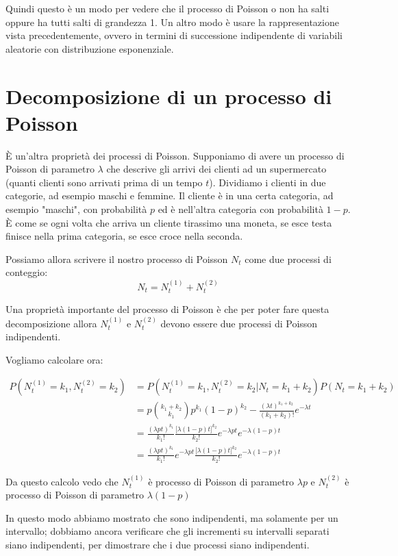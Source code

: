 \documentclass[a4paper,12pt]{book}
\begin{document}
Quindi questo è un modo per vedere che il processo di Poisson o non ha salti oppure ha tutti salti di grandezza 1. Un altro modo è usare la rappresentazione vista precedentemente, ovvero in termini di successione indipendente di variabili aleatorie con distribuzione esponenziale. 

\section{Decomposizione di un processo di Poisson}
È un'altra proprietà dei processi di Poisson. Supponiamo di avere un processo di Poisson di parametro $\lambda$ che descrive gli arrivi dei clienti ad un supermercato (quanti clienti sono arrivati prima di un tempo $ t $). Dividiamo i clienti in due categorie, ad esempio maschi e femmine. Il cliente è in una certa categoria, ad esempio "maschi", con probabilità $ p $ ed è nell'altra categoria con probabilità $ 1-p $. È come se ogni volta che arriva un cliente tirassimo una moneta, se esce testa finisce nella prima categoria, se esce croce nella seconda. 

Possiamo allora scrivere il nostro processo di Poisson $ N_t $ come due processi di conteggio:
$$ N_t = N_t^{(1)} + N_t^{(2)} $$

Una proprietà importante del processo di Poisson è che per poter fare questa decomposizione allora $ N_t^{(1)} $ e $ N_t^{(2)} $ devono essere due processi di Poisson indipendenti. 

Vogliamo calcolare ora:

\begin{align*}
	P(N_t^{(1)} = k_1, N_t^{(2)} = k_2) & = P(N_t^{(1)} = k_1, N_t^{(2)} = k_2 | N_t = k_1 + k_2) P(N_t = k_1 + k_2) \\
	& = p \binom{k_1 + k_2}{k_1} p^{k_1} (1-p)^{k_2} - \frac{(\lambda t)^{k_1 + k_2}}{(k_1 + k_2)!} e^{-\lambda t} \\
	& = \frac{(\lambda p t)^{k_1}}{k_1!} \frac{\big[ \lambda(1-p)t \big]^{k_2}}{k_2!} e^{-\lambda p t} e^{-\lambda(1-p) t} \\
	& = \frac{(\lambda p t)^{k_1}}{k_1!} e^{-\lambda p t} \frac{\big[ \lambda(1-p) t \big]^{k_2}}{k_2 !} e^{-\lambda (1-p) t}
\end{align*}

Da questo calcolo vedo che $ N_t^{(1)} $ è processo di Poisson di parametro $\lambda p$ e 
$ N_t^{(2)} $ è processo di Poisson di parametro $\lambda(1-p)$

In questo modo abbiamo mostrato che sono indipendenti, ma solamente per un intervallo; dobbiamo ancora verificare che gli incrementi su intervalli separati siano indipendenti, per dimostrare che i due processi siano indipendenti. 
\end{document}
